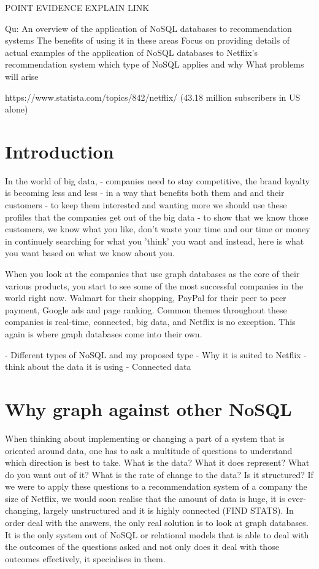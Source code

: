 \documentclass[a4paper]{article}
\begin{document}
\justify

POINT
EVIDENCE
EXPLAIN
LINK

Qu:
An overview of the application of NoSQL databases to recommendation systems
    The benefits of using it in these areas
Focus on providing details of actual examples of the application of NoSQL databases to Netflix's recommendation system
    which type of NoSQL applies and why
    What problems will arise

    https://www.statista.com/topics/842/netflix/ (43.18 million subscribers in US alone)

\section{Introduction}
\label{sec:Introduction}
In the world of big data,
- companies need to stay competitive, the brand loyalty is becoming less and less
- in a way that benefits both them and and their customers
- to keep them interested and wanting more we should use these profiles that the companies get out of the big data
- to show that we know those customers, we know what you like, don't waste your time and our time or money in continuely searching for what you 'think' you want and instead, here is what you want based on what we know about you.

When you look at the companies that use graph databases as the core of their various products, you start to see some of the most successful companies in the world right now. Walmart for their shopping, PayPal for their peer to peer payment, Google ads and page ranking. Common themes throughout these companies is real-time, connected, big data, and Netflix is no exception. This again is where graph databases come into their own.

- Different types of NoSQL and my proposed type
- Why it is suited to Netflix
    - think about the data it is using
    - Connected data

\section{Why graph against other NoSQL}
\label{sec:Why graph against other NoSQL}

When thinking about implementing or changing a part of a system that is oriented around data, one has to ask a multitude of questions to understand which direction is best to take. What is the data? What it does represent? What do you want out of it? What is the rate of change to the data? Is it structured? If we were to apply these questions to a recommendation system of a company the size of Netflix, we would soon realise that the amount of data is huge, it is ever-changing, largely unstructured and it is highly connected (FIND STATS). In order deal with the answers, the only real solution is to look at graph databases. It is the only system out of NoSQL or relational models that is able to deal with the outcomes of the questions asked and not only does it deal with those outcomes effectively, it specialises in them. \par
\end{document}
